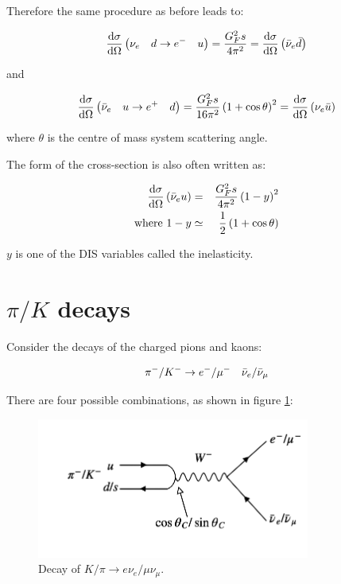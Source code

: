 Therefore the same procedure as before leads to:

\[
  \frac{\mathrm{d}\sigma}{\mathrm{d}\Omega}\left(\nu_{e} \quad d \to e^- \quad u\right) = \frac{G_F^2s}{4\pi^2} = \frac{\mathrm{d}\sigma}{\mathrm{d}\Omega}\left(\bar{\nu}_{e}\bar{d}\right)
\]

and

\[
  \frac{\mathrm{d}\sigma}{\mathrm{d}\Omega}\left(\bar{\nu}_{e}\quad u \to e^+\quad d\right) = \frac{G_F^2s}{16\pi^2}\left(1 + \cos\theta\right)^2 = \frac{\mathrm{d}\sigma}{\mathrm{d}\Omega}\left(\nu_{e}\bar{u}\right)
\]

where $\theta$ is the centre of mass system scattering angle.

The form of the cross-section is also often written as:

\begin{eqnarray*}
  \frac{\mathrm{d}\sigma}{\mathrm{d}\Omega}\left(\bar{\nu}_{e} u\right) & = & \frac{G_F^2s}{4\pi^2}\left(1 - y\right)^2 \\
  \textrm{where } 1 - y & \simeq & \frac{1}{2}\left(1 + \cos\theta\right)
\end{eqnarray*}

$y$ is one of the DIS variables called the inelasticity.

\section{\texorpdfstring{$\pi/K$}{PiK} decays}

Consider the decays of the charged pions and kaons:

\[
  \pi^- / K^- \to e^-/\mu^- \quad \bar{\nu}_{e} / \bar{\nu}_{\mu}
\]

There are four possible combinations, as shown in figure \ref{fig:ch12_PiKToENuMuNu}:

\begin{figure}[!htb]
  \begin{center}
    \includegraphics[width=0.8\textwidth]{images/web_feynman/image_54.png}
    \caption[Decay of $K/\pi\to e\nu_e/\mu\nu_\mu$]{Decay of $K/\pi\to e\nu_e/\mu\nu_\mu$.}
    \label{fig:ch12_PiKToENuMuNu}
  \end{center}
\end{figure}

